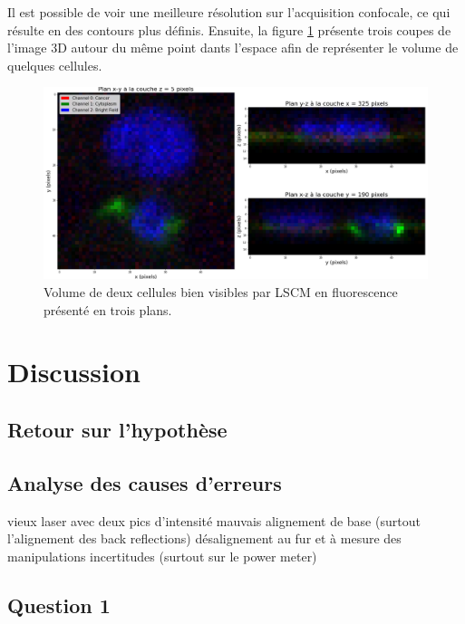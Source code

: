 \documentclass[11pt,letterpaper]{article}
\begin{document}
Il est possible de voir une meilleure résolution sur l'acquisition confocale, ce qui résulte en des contours plus définis.
Ensuite, la figure \ref{3d_cells} présente trois coupes de l'image 3D autour du même point dants l'espace afin de
représenter le volume de quelques cellules.

\begin{figure}[H]
  \centering
  \includegraphics[scale=0.34]{volume.png}
  \caption{Volume de deux cellules bien visibles par LSCM en fluorescence présenté en trois plans.}
  \label{3d_cells}
\end{figure}


\section{Discussion}

\subsection{Retour sur l'hypothèse}


\subsection{Analyse des causes d'erreurs}


vieux laser avec deux pics d'intensité
mauvais alignement de base (surtout l'alignement des back reflections)
désalignement au fur et à mesure des manipulations
incertitudes (surtout sur le power meter)

\subsection{Question 1}
\end{document}
